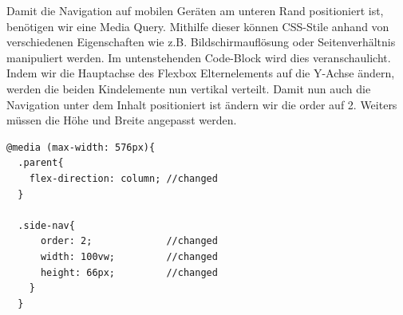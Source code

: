 Damit die Navigation auf mobilen Geräten am unteren Rand positioniert
ist, benötigen wir eine Media Query. Mithilfe dieser können CSS-Stile
anhand von verschiedenen Eigenschaften wie z.B. Bildschirmauflösung oder
Seitenverhältnis manipuliert werden. Im untenstehenden Code-Block wird
dies veranschaulicht. Indem wir die Hauptachse des Flexbox
Elternelements auf die Y-Achse ändern, werden die beiden Kindelemente
nun vertikal verteilt. Damit nun auch die Navigation unter dem Inhalt
positioniert ist ändern wir die order auf 2. Weiters müssen die Höhe und
Breite angepasst werden.

\begin{verbatim}
@media (max-width: 576px){
  .parent{
    flex-direction: column; //changed
  }

  .side-nav{
      order: 2;             //changed
      width: 100vw;         //changed
      height: 66px;         //changed
    }
  }
\end{verbatim}
